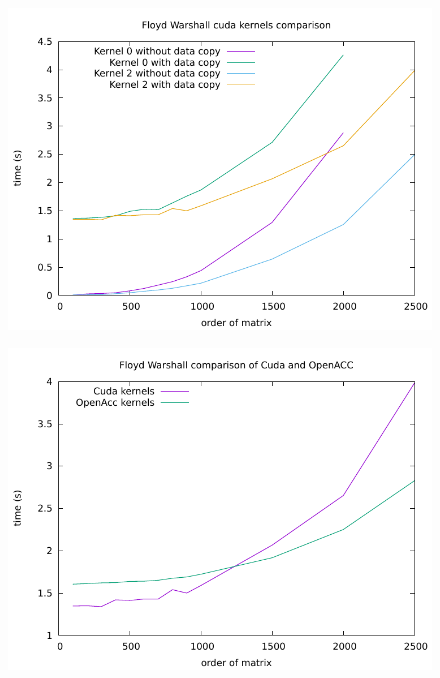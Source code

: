 \documentclass[11pt, fleqn]{article}
\begin{document}
\begin{figure}
  \centering
  \includegraphics[width=.7\linewidth]{../results/FW_Cuda2.pdf}
  \label{fig:fw4}
\end{figure}


\begin{figure}
  \centering
  \includegraphics[width=.7\linewidth]{../results/FW_Cuda3.pdf}
  \label{fig:fw5}
\end{figure}
\end{document}
